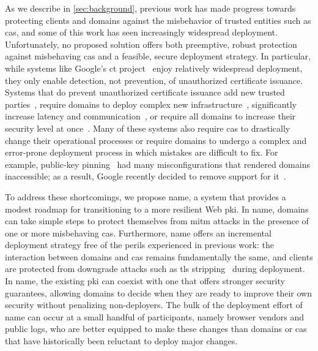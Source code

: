 As we describe in \autoref{sec:background}, previous work has made progress
towards protecting clients and domains against the misbehavior of trusted
entities such as \acp{ca}, and some of this work has seen increasingly
widespread deployment. Unfortunately, no proposed solution offers both
preemptive, robust protection against misbehaving \acp{ca} and a feasible,
secure deployment strategy. In particular, while systems like Google's \ac{ct}
project~\cite{rfc6962} enjoy relatively widespread deployment, they only enable
detection, not prevention, of unauthorized certificate issuance. Systems that do
prevent unauthorized certificate issuance add new trusted
parties~\cite{kim2013accountable}, require domains to deploy complex new
infrastructure~\cite{rfc6698, szalachowski2014policert}, significantly increase
latency and communication~\cite{yu2016dtki}, or require all domains to increase
their security level at once~\cite{basin2014arpki}. Many of these systems also
require \acp{ca} to drastically change their operational processes or require
domains to undergo a complex and error-prone deployment process in which
mistakes are difficult to fix. For example, public-key pinning~\cite{rfc7469}
had many misconfigurations that rendered domains inaccessible; as a result,
Google recently decided to remove support for it~\cite{palmer2017intent}.

To address these shortcomings, we propose \ac{name}, a system that provides a
modest roadmap for transitioning to a more resilient Web \ac{pki}. In \ac{name},
domains can take simple steps to protect themselves from \ac{mitm} attacks in
the presence of one or more misbehaving \acp{ca}. Furthermore, \ac{name} offers
an incremental  deployment strategy free of the perils experienced in previous
work: the interaction between domains and \acp{ca} remains fundamentally the
same, and clients are protected from downgrade attacks such as \ac{tls}
stripping~\cite{marlinspike2009new} during deployment. In \ac{name}, the
existing \ac{pki} can coexist with one that offers stronger security guarantees,
allowing domains to decide when they are ready to improve their own security
without penalizing non-deployers. The bulk of the deployment effort of \ac{name}
can occur at a small handful of participants, namely browser vendors and public
logs, who are better equipped to make these changes than domains or \acp{ca}
that have historically been reluctant to deploy major changes.

